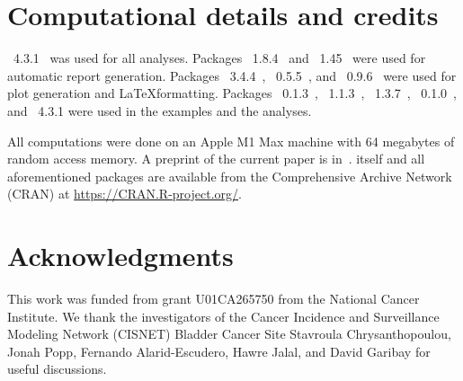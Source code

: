 \documentclass[article]{jss}\usepackage[]{graphicx}\usepackage[]{xcolor}
\begin{document}

\section*{Computational details and credits}

~4.3.1~\citep{R-program}
was used for all analyses.
Packages
~{1.8.4}~\citep{xtable-package} and
~{1.45}~\citep{knitr-package}
were used for automatic report generation. Packages
~{3.4.4}~\citep{ggplot2-package},
~{0.5.5}~\citep{ggridges-package}, and
~{0.9.6}~\citep{latex2exp-package}
were used for plot generation and \LaTeX formatting.
Packages
~{0.1.3}~\citep{nhppp-package},
~{1.1.3}~\citep{bench-package},
~{1.3.7}~\citep{rstream-package},
~{0.1.0}~\citep{otinference-package}, and
~{4.3.1}
were used in the examples and the analyses.

All computations were done on an Apple M1 Max machine with 64 megabytes of random access memory. A preprint of the current paper is in~\citet{trikalinos2024nhppp}.
%
 itself
and all aforementioned packages are available from the Comprehensive
 Archive Network (CRAN) at
\url{https://CRAN.R-project.org/}.


\section*{Acknowledgments}
This work was funded from grant U01CA265750 from the National Cancer Institute.
We thank the investigators of the Cancer Incidence and Surveillance Modeling Network (CISNET)
Bladder Cancer Site Stavroula Chrysanthopoulou, Jonah Popp, Fernando Alarid-Escudero,
Hawre Jalal, and David Garibay for useful discussions.





\end{document}
